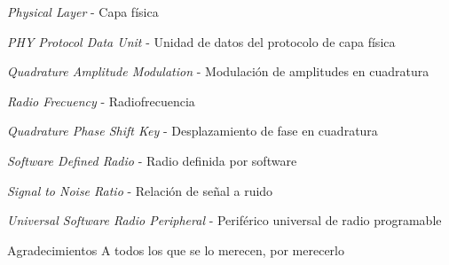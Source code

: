 \documentclass[12pt,screen,twoside,pagebackref]{ibtesis}
\begin{document}
\begin{preliminary}
\begin{abreviaturas}
\begin{description}[labelwidth=2cm,leftmargin=!]
    \item[PHY:]   \textit{Physical Layer} - Capa física
    \item[PPDU:]  \textit{PHY Protocol Data Unit} - Unidad de datos del protocolo de capa física
    \item[QAM:]   \textit{Quadrature Amplitude Modulation} - Modulación de amplitudes en cuadratura
    \item[RF:]       \textit{Radio Frecuency} - Radiofrecuencia
    \item[QPSK:]  \textit{Quadrature Phase Shift Key} - Desplazamiento de fase en cuadratura 
    \item[SDR:]   \textit{Software Defined Radio} - Radio definida por software
    \item[SNR:]   \textit{Signal to Noise Ratio} - Relación de señal a ruido
    \item[USRP:]  \textit{Universal Software Radio Peripheral} - Periférico universal de radio programable
  \end{description}
\end{abreviaturas}

\tableofcontents                %

\listoffigures                  %

\listoftables                   %



\end{preliminary}










%

\begin{biblio}

\end{biblio}


\begin{postliminary}


\begin{seccion}{Agradecimientos}
A todos los que se lo merecen, por merecerlo
\end{seccion}

\end{postliminary}
\end{document}
